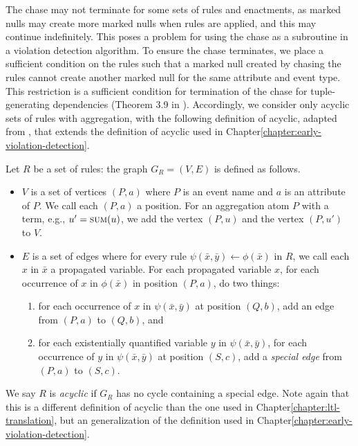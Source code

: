 The chase may not terminate
for some sets of rules and enactments,
as marked nulls may create more marked nulls
when rules are applied,
and this may continue indefinitely.
This poses a problem
for using the chase as a subroutine in a violation detection algorithm.
To ensure the chase terminates,
we place a sufficient condition on the rules
such that
a marked null created by chasing the rules
cannot create another marked null
for the same attribute and event type.
This restriction is a sufficient condition
for termination of the chase
for tuple-generating dependencies ({Theorem 3.9 in \cite{fagin2005data}}).
Accordingly,
we consider only acyclic sets of rules with aggregation,
with the following definition of acyclic,
adapted from \cite{fagin2005data},
that extends the definition of acyclic
used in Chapter\:\ref{chapter:early-violation-detection}.

Let $R$ be a set of rules:
the graph $G_{R}=(V,E)$ is defined as follows.
\begin{itemize}
\item
  $V$ is a set of vertices $(P,a)$
  where $P$ is an event name and
  $a$ is an attribute of $P$.
  We call each $(P,a)$ a position.
  For an aggregation atom $P$
  with a term, e.g., $u' = \mbox{\sc sum}(u)$,
  we add the vertex $(P,u)$ and the vertex $(P,u')$ to $V$.
\item
  $E$ is a set of edges where
  for every rule $\psi(\bar{x},\bar{y})\leftarrow\phi(\bar{x})$ in $R$,
  we call each $x$ in $\bar{x}$ a propagated variable.
  For each propagated variable $x$,
  for each occurrence of $x$ in $\phi(\bar{x})$ in position $(P,a)$,
  do two things:
  \begin{enumerate}
  \item
    for each occurrence of $x$ in $\psi(\bar{x},\bar{y})$ at position $(Q,b)$,
    add an edge from $(P,a)$ to $(Q,b)$, and
  \item
    for each existentially quantified variable $y$ in $\psi(\bar{x},\bar{y})$, 
    for each occurrence of $y$ in $\psi(\bar{x},\bar{y})$ at position $(S,c)$,
    add a {\it special edge} from $(P,a)$ to $(S,c)$.
  \end{enumerate}
\end{itemize}

We say $R$ is {\it acyclic}
if $G_{R}$ has no cycle containing a special edge.
Note again that this is a different definition of acyclic
than the one used in Chapter\:\ref{chapter:ltl-translation},
but an generalization of the definition
used in Chapter\:\ref{chapter:early-violation-detection}.

